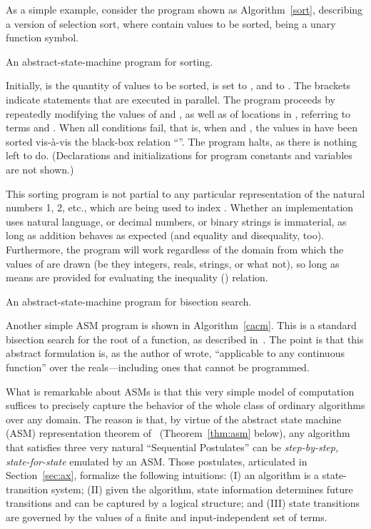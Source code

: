 \documentclass[copyright,creativecommons,english]{eptcs}
\begin{document}
As a simple example, consider the program shown as Algorithm~\ref{sort}, describing a version of selection sort,
where  contain values to be sorted,
 being a unary function symbol.
\begin{algorithm}[t]

\caption{An abstract-state-machine program for sorting.}\label{sort}
\end{algorithm}
Initially,
 is the quantity of values to be sorted,  is set to , and  to .
The brackets indicate statements that are executed in parallel.
The program proceeds by repeatedly modifying the values of  and , as well as of locations
in , referring to terms  and .
When all conditions fail, that is, when  and , 
the values in 
have been sorted vis-\`a-vis the black-box relation ``''.
The program halts, as there is nothing left to do.
(Declarations and initializations for program constants and variables
are not shown.)

This sorting program is not partial to any particular representation of the natural numbers 1, 2, etc., which are being used to index .
Whether an implementation uses natural language, or decimal numbers, or binary strings is immaterial, as long as addition
behaves as expected (and equality and disequality, too).
Furthermore, the program will work regardless of the domain from which the values of  are drawn (be they integers, reals, strings, or what not), so long as means are provided for evaluating
the inequality () relation.

\begin{algorithm}[t]

\caption{An abstract-state-machine program for bisection search.}\label{cacm}
\end{algorithm}

Another simple ASM program is shown in Algorithm~\ref{cacm}.
This is a standard bisection search for the root of a function,
as described in~\cite[Algorithm \#4]{cacm:alg4}.
The point is that this abstract formulation is, as the author of \cite{cacm:alg4} wrote, ``applicable to any continuous function'' over the reals---including ones that cannot be programmed.

What is remarkable about ASMs is that this very simple model of computation suffices
to precisely capture the behavior of the whole class of ordinary algorithms over any domain.
The reason is that, by virtue of the abstract state machine (ASM) representation theorem of~\cite{Gurevich00} (Theorem~\ref{thm:asm} below),
any algorithm that satisfies three very natural ``Sequential Postulates''
can be \textit{step-by-step, state-for-state} emulated by an ASM.
Those postulates, articulated in Section~\ref{sec:ax}, formalize the following intuitions: (I) an algorithm is a state-transition system;
(II) given the algorithm, state information determines future transitions and can be captured by a logical structure;
and (III) state transitions are governed by the values of a finite and input-independent set of terms.
\end{document}
